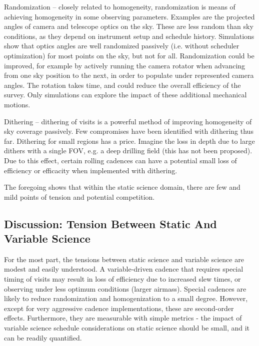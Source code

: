 \begin{description}
\item{Randomization} -- closely related to homogeneity, randomization is
means of achieving homogeneity in some observing parameters.  Examples
are the projected angles of camera and telescope optics on the sky.
These are less random than sky conditions, as they depend on instrument
setup and schedule history.  Simulations show that optics angles are
well randomized passively (i.e. without scheduler optimization) for most
points on the sky, but not for all.  Randomization could be improved,
for example by actively running the camera rotator when advancing from
one sky position to the next, in order to populate under represented
camera angles. The rotation takes time, and could reduce the overall
efficiency of the survey.  Only simulations can explore the impact of
these additional mechanical motions.

\item{Dithering} -- dithering of visits is a powerful method of
improving homogeneity of sky coverage passively. Few compromises have
been identified with dithering thus far.  Dithering for small regions
has a price. Imagine the loss in depth due to large dithers with a
single FOV, e.g. a deep drilling field (this has not been proposed).
Due to this effect, certain rolling cadences can have a potential small
loss of efficiency or efficacity when implemented with dithering.

\end{description}

The foregoing shows that within the static science domain, there are few
and mild points of tension and potential competition.


\subsection{Discussion: Tension Between Static And Variable Science}

For the most part, the tensions between static science and variable
science are modest and easily understood.  A variable-driven cadence
that requires special timing of visits may result in loss of efficiency
due to increased slew times, or observing under less optimum conditions
(larger airmass).  Special cadences are likely to reduce randomization
and homogenization to a small degree. However, except for very
aggressive cadence implementations, these are second-order effects.
Furthermore, they are measurable with simple metrics - the impact of
variable science schedule considerations on static science should be
small, and it can be readily quantified.


